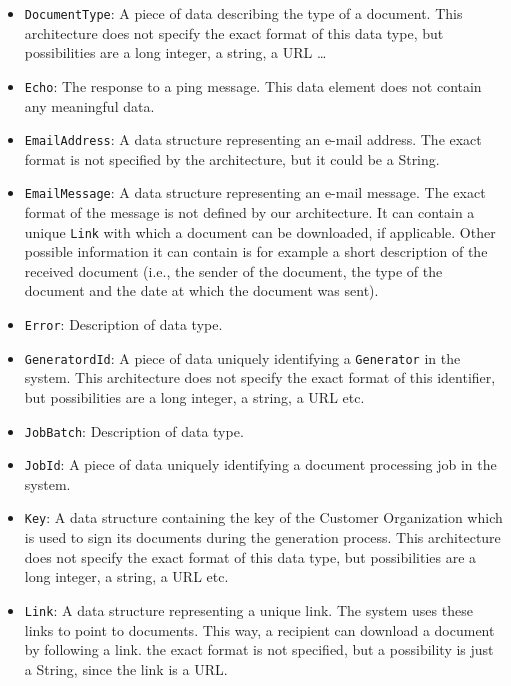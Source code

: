 \documentclass[a4paper,10pt]{article}
\begin{document}
\begin{itemize}
	\item \texttt{DocumentType}: A piece of data describing the type of a document. This architecture does not specify the exact format of this data type, but possibilities are a long integer, a string, a URL \dots
	
	\item \texttt{Echo}: The response to a ping message. This data element does not contain any meaningful data.
	
	\item \texttt{EmailAddress}: A data structure representing an e-mail address. The exact format is not specified by the architecture, but it could be a String.
	
	\item \texttt{EmailMessage}: A data structure representing an e-mail message. The exact format of the message is not defined by our architecture. It can contain a unique \texttt{Link} with which a document can be downloaded, if applicable. Other possible information it can contain is for example a short description of the received document (i.e., the sender of the document, the type of the document and the date at which the document was sent).
	
	\item \texttt{Error}: Description of data type.
	
    \item \texttt{GeneratordId}: A piece of data uniquely identifying a \texttt{Generator} in the system. This architecture does not specify the exact format of this identifier, but possibilities are a long integer, a string, a URL etc.
    
    \item \texttt{JobBatch}: Description of data type.
    
    \item \texttt{JobId}: A piece of data uniquely identifying a document processing job in the system.
    
    \item \texttt{Key}: A data structure containing the key of the Customer Organization which is used to sign its documents during the generation process. This architecture does not specify the exact format of this data type, but possibilities are a long integer, a string, a URL etc.
    
    \item \texttt{Link}: A data structure representing a unique link. The system uses these links to point to documents. This way, a recipient can download a document by following a link. the exact format is not specified, but a possibility is just a String, since the link is a URL.
    

\end{itemize}
\end{document}
